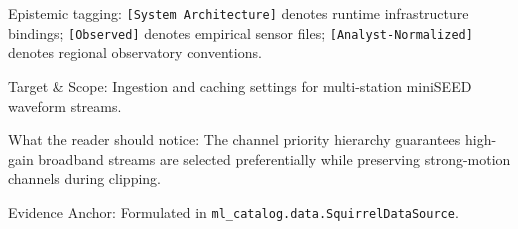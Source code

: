 \begin{landscape}
\begin{table}[htbp]
\begin{threeparttable}
      \begin{tablenotes}[flushleft]
        \footnotesize
      \item[a] Epistemic tagging: \texttt{[System Architecture]}
        denotes runtime infrastructure bindings; \texttt{[Observed]}
        denotes empirical sensor files; \texttt{[Analyst-Normalized]}
        denotes regional observatory conventions.
      \item Target \& Scope: Ingestion and caching settings for
        multi-station miniSEED waveform streams.
      \item What the reader should notice: The channel priority
        hierarchy guarantees high-gain broadband streams are selected
        preferentially while preserving strong-motion channels during clipping.
      \item Evidence Anchor: Formulated in
        \texttt{ml\_catalog.data.SquirrelDataSource}.
      \end{tablenotes}
    \end{threeparttable}
  \end{table}
\end{landscape}
